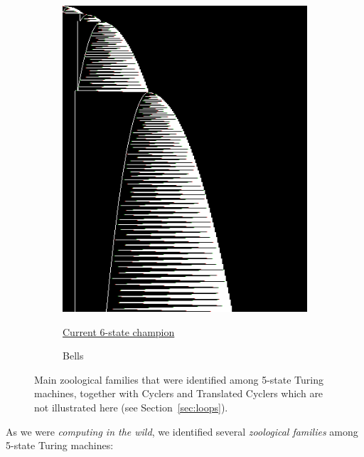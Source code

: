 \documentclass[a4paper,british]{article}
\theoremstyle{definition} %
\numberwithin{equation}{section}
\theoremstyle{definition} %
\begin{document}
\begin{figure}[htbp]
\begin{subfigure}{0.3\textwidth}
        \includegraphics[width=\linewidth]{figures/zoology/bell_1RB0LD_1RC0RF_1LC1LA_0LE1RZ_1LF0RB_0RC0RE.png}
        \caption*{Bells}
        {\scriptsize \href{https://bbchallenge.org/1RB0LD_1RC0RF_1LC1LA_0LE1RZ_1LF0RB_0RC0RE}{Current 6-state champion \cite{Pavel_discorvery}}}
    \end{subfigure}

    \caption{Main zoological families that were identified among 5-state Turing machines, together with Cyclers and Translated Cyclers which are not illustrated here (see Section~\ref{sec:loops}). }
    \label{fig:zoology}
\end{figure}

As we were \textit{computing in the wild}, we identified several \textit{zoological families} among 5-state Turing machines:
\end{document}
